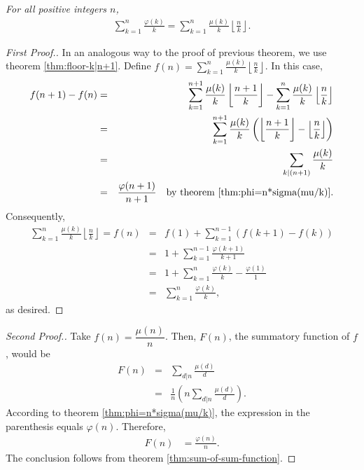 \documentclass[12pt]{subfile}
\begin{document}
		\begin{theorem}\slshape
			For all positive integers $n$,
				\begin{align*}
					\sum_{k=1}^{n} \frac{\varphi(k)}{k} = \sum_{k=1}^{n} \frac{\mu(k)}{k} \left\lfloor \frac{n}{k} \right\rfloor.
				\end{align*}
		\end{theorem}

		\begin{proof}[First Proof.]
			In an analogous way to the proof of previous theorem, we use theorem \ref{thm:floor-k|n+1}. Define $f(n)= \sum\limits_{k=1}^{n} \frac{\mu(k)}{k} \left\lfloor \frac{n}{k} \right\rfloor$. In this case,
				\begin{eqnarray*}
					f(n+1)-f(n) &=& \sum_{k=1}^{n+1} \frac{\mu(k)}{k} \left\lfloor \frac{n+1}{k} \right\rfloor - \sum_{k=1}^{n} \frac{\mu(k)}{k} \left\lfloor \frac{n}{k} \right\rfloor\\
								&=& \sum_{k=1}^{n+1} \frac{\mu(k)}{k} \left(\left\lfloor \frac{n+1}{k} \right\rfloor - \left\lfloor \frac{n}{k} \right\rfloor\right)\\
								&=& \sum_{k|(n+1)} \frac{\mu(k)}{k}\\
								&=& \frac{\varphi(n+1)}{n+1} \quad \mbox{by theorem \ref{thm:phi=n*sigma(mu/k)}}.
				\end{eqnarray*}
			Consequently,
				\begin{eqnarray*}
					\sum\limits_{k=1}^{n} \frac{\mu(k)}{k} \left\lfloor \frac{n}{k} \right\rfloor = f(n)
						&=& f(1) + \sum_{k=1}^{n-1} \left(f(k+1)-f(k)\right)\\
						&=& 1 + \sum_{k=1}^{n-1} \frac{\varphi(k+1)}{k+1}\\
						&=& 1 + \sum_{k=1}^{n} \frac{\varphi(k)}{k} - \frac{\varphi(1)}{1}\\
						&=& \sum_{k=1}^{n} \frac{\varphi(k)}{k},
				\end{eqnarray*}
			as desired.
		\end{proof}

		\begin{proof}[Second Proof.]
			Take $f(n)= \dfrac{\mu(n)}{n}$. Then, $F(n)$, the summatory function of $f$, would be
				\begin{eqnarray*}
					F(n) &=& \sum_{d|n} \frac{\mu(d)}{d} \\
						 &=& \frac{1}{n} \left(n\sum_{d|n} \frac{\mu(d)}{d}\right).
				\end{eqnarray*}
			According to theorem \ref{thm:phi=n*sigma(mu/k)}, the expression in the parenthesis equals $\varphi(n)$. Therefore,
				\begin{align*}
					F(n) &= \frac{\varphi(n)}{n}.
				\end{align*}
			The conclusion follows from theorem \ref{thm:sum-of-sum-function}.
		\end{proof}
\end{document}
